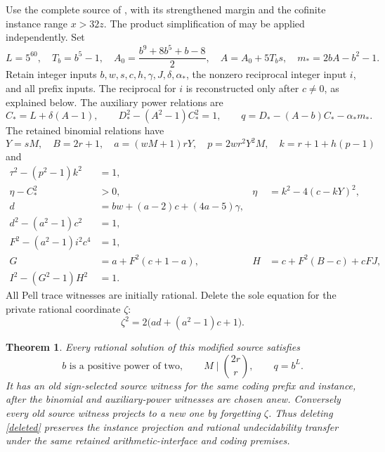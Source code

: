 \documentclass[11pt]{article}
\newtheorem{theorem}{Theorem}
\begin{document}
Use the complete source of \cite{SignedQ}, with its strengthened margin
and the cofinite instance range \(x>32z\). The product simplification
of \cite{Product} may be applied independently. Set
\[
 L=5^{60},\quad T_b=b^5-1,\quad
 A_0=\frac{b^9+8b^5+b-8}{2},\quad A=A_0+5T_bs,
 \quad m_*=2bA-b^2-1.
\]
Retain integer inputs \(b,w,s,c,h,\gamma,J,\delta,\alpha_*\),
the nonzero reciprocal integer input \(i\), and all prefix inputs.
The reciprocal for \(i\) is reconstructed only after \(c\ne0\),
as explained below. The auxiliary power relations are
\begin{equation}\label{power}
 C_*=L+\delta(A-1),\qquad
 D_*^2-(A^2-1)C_*^2=1,\qquad
 q=D_*-(A-b)C_*-\alpha_*m_*.
\end{equation}
The retained binomial relations have
\begin{equation}\label{bin-def}
 Y=sM,\quad B=2r+1,\quad
 a=(wM+1)rY,\quad p=2wr^2Y^2M,
 \quad k=r+1+h(p-1)
\end{equation}
and
\begin{align}
 \tau^2-(p^2-1)k^2&=1,\label{small}\\
 \eta-C_*^2&>0,&\eta&=k^2-4(c-kY)^2,\label{margin}\\
 d&=bw+(a-2)c+(4a-5)\gamma,\label{linear}\\
 d^2-(a^2-1)c^2&=1,\label{first}\\
 F^2-(a^2-1)i^2c^4&=1,\label{second}\\
 G&=a+F^2(c+1-a),& H&=c+F^2(B-c)+cFJ,\label{crt}\\
 I^2-(G^2-1)H^2&=1.\label{third}
\end{align}
All Pell trace witnesses are initially rational. Delete the sole
equation for the private rational coordinate \(\zeta\):
\begin{equation}\label{deleted}
                 \zeta^2=2\bigl(ad+(a^2-1)c+1\bigr).
\end{equation}

\begin{theorem}\label{main}
Every rational solution of this modified source satisfies
\[
 b\text{ is a positive power of two},\qquad
 M\mid\binom{2r}{r},\qquad q=b^L.
\]
It has an old sign-selected source witness for the same coding prefix
and instance, after the binomial and auxiliary-power witnesses are
chosen anew. Conversely every old source witness projects to a new
one by forgetting \(\zeta\). Thus deleting \eqref{deleted} preserves
the instance projection and rational undecidability transfer under
the same retained arithmetic-interface and coding premises.
\end{theorem}
\end{document}

